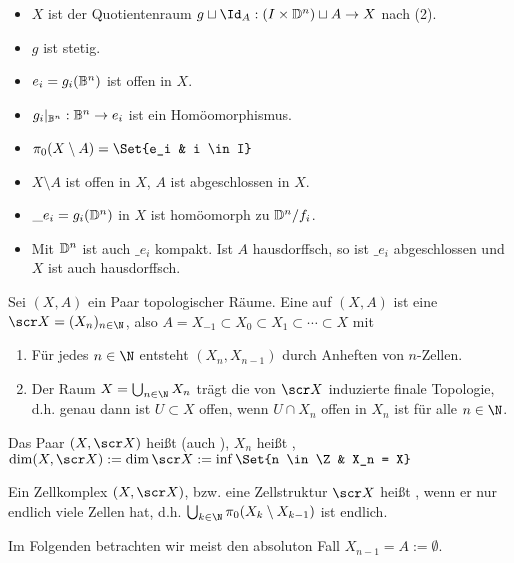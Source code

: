 \begin{nt}
    \begin{itemize}
        \item
            $X$ ist der Quotientenraum
            \begin{math}
                g \sqcup \Id_A: (I \times \D^n) \sqcup A \to X
            \end{math}
            nach (2).
        \item
            $g$ ist stetig.
        \item
            $e_i = g_i(\mathbb{B}^n)$ ist offen in $X$.
        \item
            $g_i|_{\mathbb{B}^n}: \mathbb{B}^n \to e_i$ ist ein Homöomorphismus.
        \item
            $\pi_0(X \setminus A) = \Set{e_i & i \in I}$
        \item
            $X \setminus A$ ist offen in $X$, $A$ ist abgeschlossen in $X$.
        \item
            $\_{e_i} = g_i(\mathbb{D}^n)$ in $X$ ist homöomorph zu $\mathbb{D}^n / f_i$.
        \item
            Mit $\mathbb{D}^n$ ist auch $\_{e_i}$ kompakt.
            Ist $A$ hausdorffsch, so ist $\_{e_i}$ abgeschlossen und $X$ ist auch hausdorffsch.
    \end{itemize}
\end{nt}

\begin{df}
    Sei $(X, A)$ ein Paar topologischer Räume.
    Eine  auf $(X, A)$ ist eine  $\scr X = (X_n)_{n \in \N}$, also $A = X_{-1} \subset X_0 \subset X_1 \subset \dotsb \subset X$ mit
    \begin{enumerate}[(1)]
        \item
            Für jedes $n \in \N$ entsteht $(X_n, X_{n-1})$ durch Anheften von $n$-Zellen.
        \item
            Der Raum $X = \bigcup_{n \in \N} X_n$ trägt die von $\scr X$ induzierte finale Topologie, d.h. genau dann ist $U \subset X$ offen, wenn $U \cap X_n$ offen in $X_n$ ist für alle $n \in \N$.
    \end{enumerate}
    Das Paar $(X, \scr X)$ heißt  (auch ), $X_n$ heißt , $\dim (X, \scr X) := \dim \scr X := \inf \Set{n \in \Z & X_n = X}$

    Ein Zellkomplex $(X, \scr X)$, bzw. eine Zellstruktur $\scr X$ heißt , wenn er nur endlich viele Zellen hat, d.h. $\bigcup_{k \in \N} \pi_0(X_k \setminus X_{k-1})$ ist endlich.

    Im Folgenden betrachten wir meist den absoluton Fall $X_{n-1} = A := \emptyset$.
\end{df}

